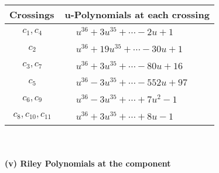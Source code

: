 \documentclass[1p]{elsarticle_modified}
\theoremstyle{definition}
\begin{document}
\begin{tabular}{m{50pt}|m{274pt}}
Crossings & \hspace{64pt}u-Polynomials at each crossing \\
\hline $$\begin{aligned}c_{1},c_{4}\end{aligned}$$&$\begin{aligned}
&u^{36}+3 u^{35}+\cdots-2 u+1
\end{aligned}$\\
\hline $$\begin{aligned}c_{2}\end{aligned}$$&$\begin{aligned}
&u^{36}+19 u^{35}+\cdots-30 u+1
\end{aligned}$\\
\hline $$\begin{aligned}c_{3},c_{7}\end{aligned}$$&$\begin{aligned}
&u^{36}+3 u^{35}+\cdots-80 u+16
\end{aligned}$\\
\hline $$\begin{aligned}c_{5}\end{aligned}$$&$\begin{aligned}
&u^{36}-3 u^{35}+\cdots-552 u+97
\end{aligned}$\\
\hline $$\begin{aligned}c_{6},c_{9}\end{aligned}$$&$\begin{aligned}
&u^{36}-3 u^{35}+\cdots+7 u^2-1
\end{aligned}$\\
\hline $$\begin{aligned}c_{8},c_{10},c_{11}\end{aligned}$$&$\begin{aligned}
&u^{36}+3 u^{35}+\cdots+8 u-1
\end{aligned}$\\
\hline
\end{tabular}\\~\\
\newpage\renewcommand{\arraystretch}{1}
\flushleft \textbf{(v) Riley Polynomials at the component}\newline \\
\end{document}
